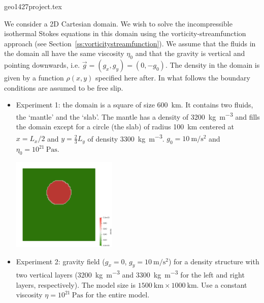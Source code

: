 \begin{flushright} {\tiny {\color{gray} geo1427project.tex}} \end{flushright}


We consider a 2D Cartesian domain. We wish to solve the incompressible 
isothermal Stokes equations in this domain using the 
vorticity-streamfunction approach (see Section~\ref{ss:vorticitystreamfunction}). 
We assume that the fluids in the domain all have the same viscosity 
$\eta_0$ and that the gravity is vertical 
and pointing downwards, i.e.  $\vec{g}=(g_x,g_y)=(0,-g_0)$.
The density in the domain is given by a  function $\rho(x,y)$ specified
here after. In what follows the boundary conditions are assumed to be free slip. 

\begin{itemize}
\item
Experiment 1: the domain is a square of size 600~\si{\km}.  
It contains two fluids, the `mantle'  and the `slab'. 
The mantle has a density of 3200~\si{\kg\per\cubic\meter} 
and fills the domain except for a circle (the slab) of radius 100~\si{\km} 
centered at $x=L_x/2$ and $y=\frac23 L_y$  of density 
3300~\si{\kg\per\cubic\meter}. $g_0=10~\si{\meter\per\square\second}$ 
and $\eta_0=10^{21}~\si{\pascal\second}$.

\begin{center}
\includegraphics[width=5cm]{images/fdm/project/rho1}
\end{center}

\item
Experiment 2: 
gravity ﬁeld ($g_x=0$, $g_y=10~\si{\meter\per\square\second}$) 
for a density structure with two vertical layers 
(3200~\si{\kg\per\cubic\meter} and 3300~\si{\kg\per\cubic\meter} 
for the left and right layers, respectively). The model size is  
$1500~\si{\km} \times 1000~\si{\km}$.
Use a constant viscosity $\eta = 10^{21}~\si{\pascal\second}$ 
for the entire model.
\end{itemize}

